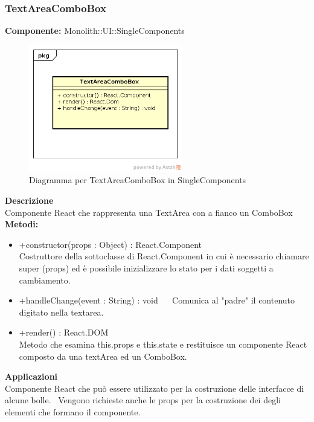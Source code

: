 \clearpage

\subsubsection{TextAreaComboBox}
\textbf{Componente:}  Monolith::UI::SingleComponents\\
   \FloatBarrier
   \begin{figure}[ht]
   \centering
   \includegraphics[width=0.6\textwidth]{img/single-TextAreaComboBox}
   \caption{{Diagramma per TextAreaComboBox in SingleComponents}}
\end{figure}
\FloatBarrier
\textbf{Descrizione}\\
Componente React che rappresenta una TextArea con a fianco un ComboBox \\
\textbf{Metodi:} 
\begin{itemize}

\item +constructor(props : Object) : React.Component 
\\
Costruttore della sottoclasse di React.Component in cui è necessario chiamare super (props) ed è possibile inizializzare lo stato per i dati soggetti a cambiamento.

\item +handleChange(event : String) : void  
\ 
Comunica al "padre" il contenuto digitato nella textarea.

\item +render() : React.DOM 
\\
Metodo che esamina this.props e this.state e restituisce un componente React composto da una textArea ed un ComboBox.

\end{itemize} 


\textbf{Applicazioni}\\
Componente React che può essere utilizzato per la costruzione delle interfacce di alcune bolle.
\ Vengono richieste anche le props per la costruzione dei degli elementi che formano il componente. 


